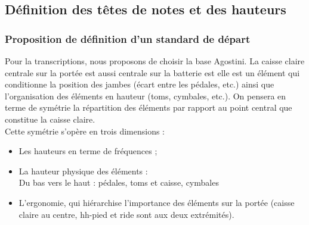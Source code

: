 \subsection*{Définition des têtes de notes et des hauteurs}
\subsubsection*{Proposition de définition d’un standard de départ}
Pour la transcriptions, nous proposons de choisir la base Agostini. La caisse claire centrale sur la portée est aussi centrale sur la batterie est elle est un élément qui conditionne la position des jambes (écart entre les pédales, etc.) ainsi que l’organisation des éléments en hauteur (toms, cymbales, etc.).
On pensera en terme de symétrie la répartition des éléments par rapport au point central que constitue la caisse claire.\\
Cette symétrie s’opère en trois dimensions :
\begin{itemize}
	\item Les hauteurs en terme de fréquences ;
	\item La hauteur physique des éléments :\\
	Du bas vers le haut : pédales, toms et caisse, cymbales
	\item L’ergonomie, qui hiérarchise l’importance des éléments sur la portée (caisse claire au centre, hh-pied et ride sont aux deux extrémités).
\end{itemize}
